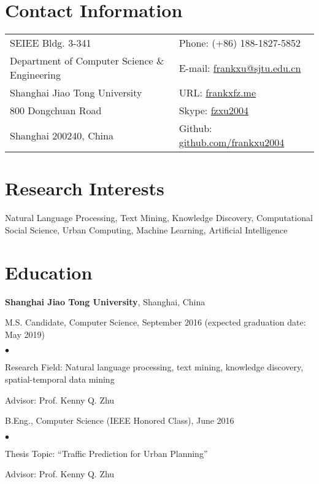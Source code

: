 \documentclass[margin,line]{res}
\newenvironment{list1}{
  \begin{list}{\ding{113}}{%
      \setlength{\itemsep}{0in}
      \setlength{\parsep}{0in} \setlength{\parskip}{0in}
      \setlength{\topsep}{0in} \setlength{\partopsep}{0in} 
      \setlength{\leftmargin}{0.17in}}}{\end{list}}
\newenvironment{list2}{
  \begin{list}{$\bullet$}{%
      \setlength{\itemsep}{0in}
      \setlength{\parsep}{0in} \setlength{\parskip}{0in}
      \setlength{\topsep}{0in} \setlength{\partopsep}{0in} 
      \setlength{\leftmargin}{0.2in}}}{\end{list}}
\begin{document}

\begin{resume}
\section{\sc Contact Information}
\vspace{.05in}
\begin{tabular}{@{}p{3in}p{4in}}
SEIEE Bldg. 3-341             & {Phone:}  (+86) 188-1827-5852 \\            
Department of Computer Science \& Engineering   & { E-mail:}  \url{frankxu@sjtu.edu.cn} \\         
Shanghai Jiao Tong University & {URL:} \url{frankxfz.me}\\       
800 Dongchuan Road   & {Skype:} \url{fzxu2004}\\  
Shanghai 200240, China & {Github:} \url{github.com/frankxu2004}
\end{tabular}


\section{\sc Research Interests}
Natural Language Processing, Text Mining, Knowledge Discovery, Computational Social Science, Urban Computing, Machine Learning, Artificial Intelligence

\section{\sc Education}
{\bf Shanghai Jiao Tong University}, Shanghai, China\\
\vspace*{-.1in}
\begin{list1}
\item[] M.S. Candidate, Computer Science, September 2016 (expected
  graduation date: May 2019)
\begin{list2}
\vspace*{.05in}
\item Research Field: Natural language processing, text mining, knowledge discovery, spatial-temporal data mining
\item Advisor:  Prof. Kenny Q. Zhu
\end{list2}
\vspace*{.05in}
\item[] B.Eng., Computer Science (IEEE Honored Class), June 2016
\begin{list2}
	\vspace*{.05in}
	\item Thesis Topic: ``Traffic Prediction for Urban Planning''
	\item Advisor: Prof. Kenny Q. Zhu
\end{list2}
\end{list1}


\end{resume}
\end{document}
